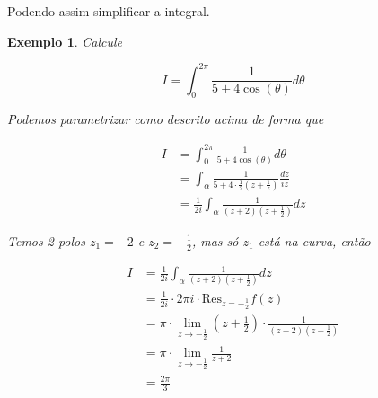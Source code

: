\documentclass{article}
\newtheorem{ex}{Exemplo}
\begin{document}
Podendo assim simplificar a integral.

\begin{ex}
Calcule

\begin{equation*}
    I = \int_0^{2 \pi} \frac{1}{5 + 4 \cos(\theta)} d \theta
\end{equation*}

Podemos parametrizar como descrito acima de forma que

\begin{align*}
    I &= \int_0^{2 \pi} \frac{1}{5 + 4 \cos(\theta)} d \theta \\
    &= \int_\alpha \frac{1}{5 + 4 \cdot \frac{1}{2} (z + \frac{1}{z})} \frac{d z}{i z} \\
    &= \frac{1}{2 i} \int_\alpha \frac{1}{(z + 2) (z + \frac{1}{2})} d z
\end{align*}

Temos 2 polos $z_1 = -2$ e $z_2 = - \frac{1}{2}$, mas só $z_1$ está na curva, então

\begin{align*}
    I &= \frac{1}{2 i} \int_\alpha \frac{1}{(z + 2) (z + \frac{1}{2})} d z \\
    &= \frac{1}{2 i} \cdot 2 \pi i \cdot \mathrm{Res}_{z = - \frac{1}{2}} f(z) \\
    &= \pi \cdot \lim_{z \to - \frac{1}{2}} \left(z + \frac{1}{2} \right) \cdot \frac{1}{(z + 2) (z + \frac{1}{2})} \\
    &= \pi \cdot \lim_{z \to - \frac{1}{2}} \frac{1}{z + 2} \\
    &= \frac{2 \pi}{3}
\end{align*}
\end{ex}
\end{document}
